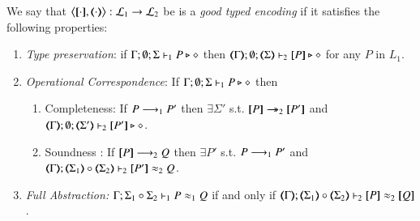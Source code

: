 \begin{definition}
	\label{def:ep}
	We say that $\enc{\cdot}{\cdot} : \tyl{L}_1 \to \tyl{L}_2$ be is a \emph{good  typed encoding} if it satisfies the following properties:
	
	\begin{enumerate}[1.]
		\item \emph{Type preservation}:	%
		if
			$\Gamma; \emptyset; \Sigma \vdash_1 P \triangleright \diamond$ then $\mapt{\Gamma}; \emptyset; \mapt{\Sigma} \proves_2 \map{P} \hastype \Proc$ for any   $P$ in $L_1$.

		\item \emph{Operational Correspondence}: If $\Gamma; \emptyset; \Sigma \vdash_1 P \triangleright \diamond$ then
		\begin{enumerate}[-]
			\item	Completeness: If $P \longrightarrow_1 P'$ then $\exists \Sigma'$ s.t.
				$\map{P} \Red_2 \map{P'}$ and
				$\mapt{\Gamma}; \emptyset; \mapt{\Sigma'} \proves_2 \map{P'} \hastype \Proc$.
			\item Soundness : If $[\!\![P]\!\!] \longrightarrow_2 Q$ then
				$\exists P'$ s.t. $P \longrightarrow_1 P'$ and \\
				$\mapt{\Gamma}; \mapt{\Sigma_1} \circ \mapt{\Sigma_2} \proves_2 \map{P'} \wb_2 Q$.
		\end{enumerate}
		
		\item \emph{Full Abstraction:} %
		$\Gamma; \Sigma_1 \circ \Sigma_2 \vdash_1 P \approx_1 Q $ if and only if $\mapt{\Gamma}; \mapt{\Sigma_1} \circ \mapt{\Sigma_2} \proves_2 \map{P} \wb_2 \map{Q} $.
	\end{enumerate}
\end{definition}

